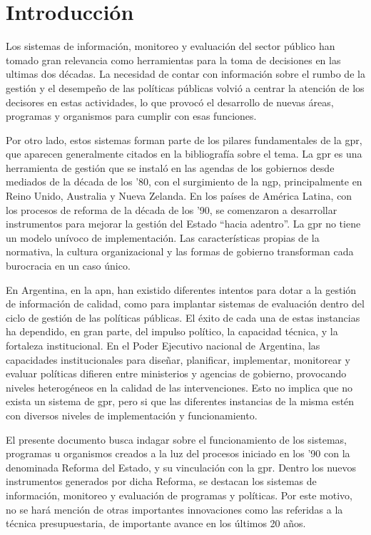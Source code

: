 \newpage
\section{Introducción}\label{introduccion}

Los sistemas de información, monitoreo y evaluación del sector público han tomado gran relevancia como herramientas para la toma de decisiones en las ultimas dos décadas. La necesidad de contar con información sobre el rumbo de la gestión y el desempeño de las políticas públicas volvió a centrar la atención de los decisores en estas actividades, lo que provocó el desarrollo de nuevas áreas, programas y organismos para cumplir con esas funciones.

Por otro lado, estos sistemas forman parte de los pilares fundamentales de la \ac{gpr}, que aparecen generalmente citados en la bibliografía sobre el tema. La \ac{gpr} es una herramienta de gestión que se instaló en las agendas de los gobiernos desde mediados de la década de los '80, con el surgimiento de la \ac{ngp}, principalmente en Reino Unido, Australia y Nueva Zelanda. En los países de América Latina, con los procesos de reforma de la década de los '90, se comenzaron a desarrollar instrumentos para mejorar la gestión del Estado ``hacia adentro''. La \ac{gpr} no tiene un modelo unívoco de implementación. Las características propias de la normativa, la cultura organizacional y las formas de gobierno transforman cada burocracia en un caso único.

En Argentina, en la \ac{apn}, han existido diferentes intentos para dotar a la gestión de información de calidad, como para implantar sistemas de evaluación dentro del ciclo de gestión de las políticas públicas. El éxito de cada una de estas instancias ha dependido, en gran parte, del impulso político, la capacidad técnica, y la fortaleza institucional. En el Poder Ejecutivo nacional de Argentina, las capacidades institucionales para diseñar, planificar, implementar, monitorear y evaluar políticas difieren entre ministerios y agencias de gobierno, provocando niveles heterogéneos en la calidad de las intervenciones. Esto no implica que no exista un sistema de \ac{gpr}, pero si que las diferentes instancias de la misma estén con diversos niveles de implementación y funcionamiento.

El presente documento busca indagar sobre el funcionamiento de los sistemas, programas u organismos creados a la luz del procesos iniciado en los '90 con la denominada Reforma del Estado, y su vinculación con la \ac{gpr}. Dentro los nuevos instrumentos generados por dicha Reforma, se destacan los sistemas de información, monitoreo y evaluación de programas y políticas. Por este motivo, no se hará mención de otras importantes innovaciones como las referidas a la técnica presupuestaria, de importante avance en los últimos 20 años.


